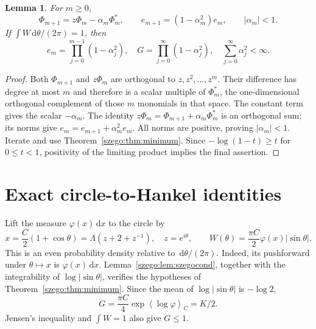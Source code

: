 \documentclass[11pt,a4paper]{article}
\numberwithin{equation}{section}
\newtheorem{lemma}[theorem]{Lemma}
\theoremstyle{remark}\newtheorem{remark}[theorem]{Remark}
\newcommand{\dd}{\,\mathrm d}
\newcommand{\Lam}{\Lambda}
\newcommand{\mean}[1]{\left\langle#1\right\rangle}
\begin{document}
\begin{lemma}\label{szego:lem:recurrence}
For $m\geq0$,
\begin{equation}\label{szego:eq:opuc}
 \Phi_{m+1}=z\Phi_m-\alpha_m\Phi_m^*,\qquad
 e_{m+1}=(1-\alpha_m^2)e_m,\qquad |\alpha_m|<1.
\end{equation}
If $\int W\dd\theta/(2\pi)=1$, then
\begin{equation}\label{szego:eq:product}
 e_m=\prod_{j=0}^{m-1}(1-\alpha_j^2),\quad
 G=\prod_{j=0}^{\infty}(1-\alpha_j^2),\quad
 \sum_{j=0}^{\infty}\alpha_j^2<\infty.
\end{equation}
\end{lemma}
\begin{proof}
Both $\Phi_{m+1}$ and $z\Phi_m$ are orthogonal to
$z,z^2,\ldots,z^m$. Their difference has degree at most $m$ and therefore
is a scalar multiple of $\Phi_m^*$, the one-dimensional orthogonal
complement of those $m$ monomials in that space.
The constant term gives the scalar $-\alpha_m$.
The identity $z\Phi_m=\Phi_{m+1}+\alpha_m\Phi_m^*$ is an orthogonal sum;
its norms give $e_m=e_{m+1}+\alpha_m^2e_m$.
All norms are positive, proving $|\alpha_m|<1$.
Iterate and use Theorem~\ref{szego:thm:minimum}.
Since $-\log(1-t)\geq t$ for $0\leq t<1$, positivity of the limiting
product implies the final assertion.
\end{proof}

\section{Exact circle-to-Hankel identities}
\label{szego:sec:identities}
Lift the measure $\varphi(x)\dd x$ to the circle by
\begin{equation}\label{szego:eq:lift}
 x=\frac C2(1+\cos\theta)=\Lam(z+2+z^{-1}),\quad z=e^{i\theta},\qquad
 W(\theta)=\frac{\pi C}{2}\varphi(x)|\sin\theta|.
\end{equation}
This is an even probability density relative to $\dd\theta/(2\pi)$.
Indeed, its pushforward under $\theta\mapsto x$ is $\varphi(x)\dd x$.
Lemma~\ref{szego:lem:szegocond}, together with the integrability of $\log|\sin\theta|$,
verifies the hypotheses of Theorem~\ref{szego:thm:minimum}.
Since the mean of $\log|\sin\theta|$ is $-\log2$,
\begin{equation}\label{szego:eq:K2G}
 G=\frac{\pi C}{4}\exp\mean{\log\varphi}_C=K/2.
\end{equation}
Jensen's inequality and $\int W=1$ also give $G\leq1$.
\end{document}
